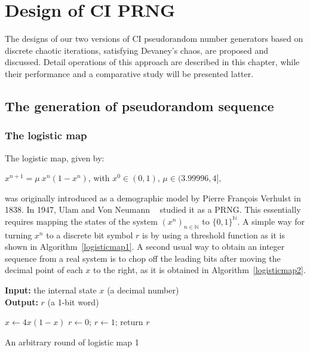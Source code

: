 \chapter{Design of CI PRNG}
\label{Design of CI PRNG}
\minitoc
The designs of our two versions of CI pseudorandom number generators based on discrete chaotic iterations, satisfying Devaney's chaos, are proposed and discussed. Detail operations of this approach are described in this chapter, while their performance and a comparative study will be presented latter.


\section{The generation of pseudorandom sequence}
\label{The generation of pseudorandom sequence}
\subsection{The logistic map}


The logistic map, given by:
\begin{center}
$x^{n+1}=\mu ~ x^{n}(1-x^{n})$, with $x^{0}\in(0,1)$, $\mu \in(3.99996,4]$,
\end{center}

\noindent was originally introduced as a demographic model by Pierre Fran\c cois Verhulst in 1838. In 1947, Ulam and Von Neumann ~\cite{ulam1947} studied it as a PRNG. This essentially requires mapping the states of the system $\left(x^n\right)_{n \in \mathds{N}}$ to $\{0,1\}^\mathds{N}$. A simple way for turning $x^n$ to a discrete bit symbol $r$ is by using a threshold function as it is shown in Algorithm~\ref{logisticmap1}.
A second usual way to obtain an integer sequence from a real system is to chop off the leading bits after moving the decimal point of each $x$ to the right, as it is obtained in Algorithm~\ref{logisticmap2}.

\begin{algorithm}
\textbf{Input:} the internal state $x$ (a decimal number)\\
\textbf{Output:} $r$ (a 1-bit word)
\begin{algorithmic}[1]
\STATE$x\leftarrow{4x(1-x)}$
{
\STATE$r\leftarrow0$;	
}
\ELSE
{
\STATE$r\leftarrow1$;	
}\ENDIF
\STATE return $r$\;
\medskip
\caption{An arbitrary round of logistic map 1}
\label{logisticmap1}
\end{algorithmic}
\end{algorithm}

